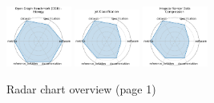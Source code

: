 \begin{figure}[ht!]
\includegraphics[width=0.1900\textwidth]{images/open_graph_benchmark_ogb_-_biology_radar.pdf}
\includegraphics[width=0.1900\textwidth]{images/jet_classification_radar.pdf}
\includegraphics[width=0.1900\textwidth]{images/irregular_sensor_data_compression_radar.pdf}
\\[1ex]
\caption{Radar chart overview (page 1)}
\end{figure}


\clearpage

